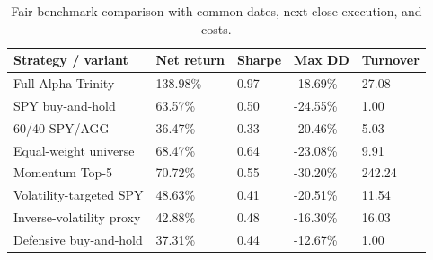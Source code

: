 \begin{table}[htbp]
\caption{Fair benchmark comparison with common dates, next-close execution, and costs.}
\label{tab:baselines}
\begin{tabular}{lllll}
\toprule
Strategy / variant & Net return & Sharpe & Max DD & Turnover \\
\midrule
Full Alpha Trinity & 138.98\% & 0.97 & -18.69\% & 27.08 \\
SPY buy-and-hold & 63.57\% & 0.50 & -24.55\% & 1.00 \\
60/40 SPY/AGG & 36.47\% & 0.33 & -20.46\% & 5.03 \\
Equal-weight universe & 68.47\% & 0.64 & -23.08\% & 9.91 \\
Momentum Top-5 & 70.72\% & 0.55 & -30.20\% & 242.24 \\
Volatility-targeted SPY & 48.63\% & 0.41 & -20.51\% & 11.54 \\
Inverse-volatility proxy & 42.88\% & 0.48 & -16.30\% & 16.03 \\
Defensive buy-and-hold & 37.31\% & 0.44 & -12.67\% & 1.00 \\
\bottomrule
\end{tabular}
\end{table}

